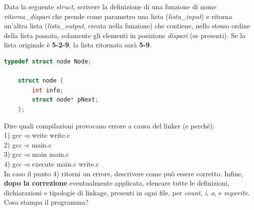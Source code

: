 \begin{questions}


\question[6]
Data la seguente \emph{struct}, scrivere la definizione di una funzione di nome \emph{ritorna\_dispari} che prende come parametro una lista (\emph{lista\_input}) e ritorna un'altra lista (\emph{lista\_output}, creata nella funzione) che contiene, nello stesso ordine della lista passata, solamente gli elementi in posizione \emph{dispari} (se presenti). Se la lista originale è \textbf{5-2-9}, la lista ritornata sarà \textbf{5-9}.

\begin{minipage}[t]{0.5\linewidth}
	\begin{lstlisting}[language=C]
	typedef struct node Node;

	struct node {
		int info;
		struct node* pNext;
	};
	\end{lstlisting}
\end{minipage}


\newpage

\begin{center}
\end{center}

\vspace{5mm}

\noindent{}



\question[7]
Dire quali compilazioni provocano errore a causa del linker (e perchè):\\
1) gcc -o write write.c\\
2) gcc -c main.c\\
3) gcc -o main main.c\\
4) gcc -o execute main.c write.c\\
In caso il punto 4) ritorni un errore, descrivere come può essere corretto. Infine, \textbf{dopo la correzione} eventualmente applicata, elencare tutte le definizioni, dichiarazioni e tipologie di linkage, presenti in ogni file, per \emph{count}, \emph{i}, \emph{a}, e \emph{mywrite}. Cosa stampa il programma?


\end{questions}
